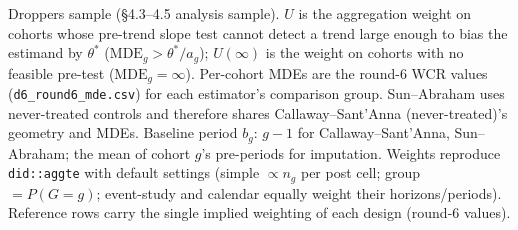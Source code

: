 \smallskip
{\footnotesize \noindent Droppers sample (\S4.3--4.5 analysis sample). $U$ is the aggregation weight on cohorts whose pre-trend slope test cannot detect a trend large enough to bias the estimand by $\theta^{*}$ ($\mathrm{MDE}_g>\theta^{*}/a_g$); $U(\infty)$ is the weight on cohorts with no feasible pre-test ($\mathrm{MDE}_g=\infty$). Per-cohort MDEs are the round-6 WCR values (\texttt{d6\_round6\_mde.csv}) for each estimator's comparison group. Sun--Abraham uses never-treated controls and therefore shares Callaway--Sant'Anna (never-treated)'s geometry and MDEs. Baseline period $b_g$: $g-1$ for Callaway--Sant'Anna, Sun--Abraham; the mean of cohort $g$'s pre-periods for imputation. Weights reproduce \texttt{did::aggte} with default settings (simple $\propto n_g$ per post cell; group $= P(G{=}g)$; event-study and calendar equally weight their horizons/periods). Reference rows carry the single implied weighting of each design (round-6 values).\par}
